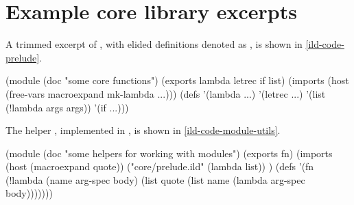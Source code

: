 \section{Example core library excerpts}
\label{ild-code-appendix}
A trimmed excerpt of , with elided definitions
denoted as , is shown in \cref{ild-code-prelude}.
\begin{listingbox}\begin{ildcode}
(module
  (doc "some core functions")
  (exports lambda letrec if list)
  (imports
    (host
      (free-vars macroexpand mk-lambda ...)))
  (defs
    '(lambda ...)
    '(letrec ...)
    '(list (!lambda args args))
    '(if ...)))
\end{ildcode}\end{listingbox}
\label{ild-code-prelude}
The helper , implemented in , is shown in \cref{ild-code-module-utils}.
\begin{listingbox}\begin{ildcode}
(module
  (doc "some helpers for working with modules")
  (exports fn)
  (imports
    (host
      (macroexpand quote))
    ("core/prelude.ild"
      (lambda list))
  )
  (defs
    '(fn (!lambda (name arg-spec body)
      (list quote
        (list
          name
          (lambda arg-spec body)))))))
\end{ildcode}\end{listingbox}
\label{ild-code-module-utils}
